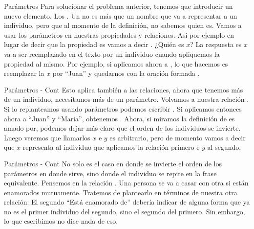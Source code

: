 
\begin{frame}{Parámetros}
  Para solucionar el problema anterior, tenemos que introducir un nuevo elemento.
  Los .
  \jump
  Un  no es más que un nombre que va a representar a un individuo,
  pero que al momento de la definición, no sabemos quien es.
  \jump
  Vamos a usar los parámetros en nuestras propiedades y relaciones. Así por ejemplo
  en lugar de decir que la propiedad es  vamos a decir
  .
  \jump
  ¿Quién es $x$? La respuesta es $x$ va a ser reemplazado en el texto por un individuo
  cuando apliquemos la propiedad al mismo. Por ejemplo, si aplicamos ahora
   a , lo que hacemos es reemplazar
  la $x$ por ``Juan'' y quedarnos con la oración formada .
\end{frame}


\begin{frame}{Parámetros - Cont}
  Esto aplica también a las relaciones, ahora que tenemos más de un individuo,
  necesitamos más de un parámetro.
  \jump
  Volvamos a nuestra relación . Si lo
  replanteamos usando parámetros podemos escribir
  . Si aplicamos entonces ahora a
  ``Juan'' y ``María'', obtenemos  .
  \jump
  Ahora, si miramos la definición de es amado por, podemos dejar más claro que
  el orden de los individuos se invierte.
  \jump
  \jump
  Luego veremos que llamarlos $x$ e $y$ es arbitrario, pero de momento vamos a
  decir que $x$ representa al individuo que aplicamos la relación primero e $y$
  al segundo.
\end{frame}


\begin{frame}{Parámetros - Cont}
  No solo es el caso en donde se invierte el orden de los parámetros en
  donde sirve, sino donde el individuo se repite en la frase equivalente.
  \jump
  Pensemos en la relación . Una persona se
  va a casar con otra si están enamorados mutuamente. Tratemos de plantearlo
  en términos de nuestra otra relación:
  \jump
  \jump
  El segundo ``Está enamorado de'' debería indicar de alguna forma que ya no es
  el primer individuo del segundo, sino el segundo del primero. Sin embargo, lo
  que escribimos no dice nada de eso.
\end{frame}

